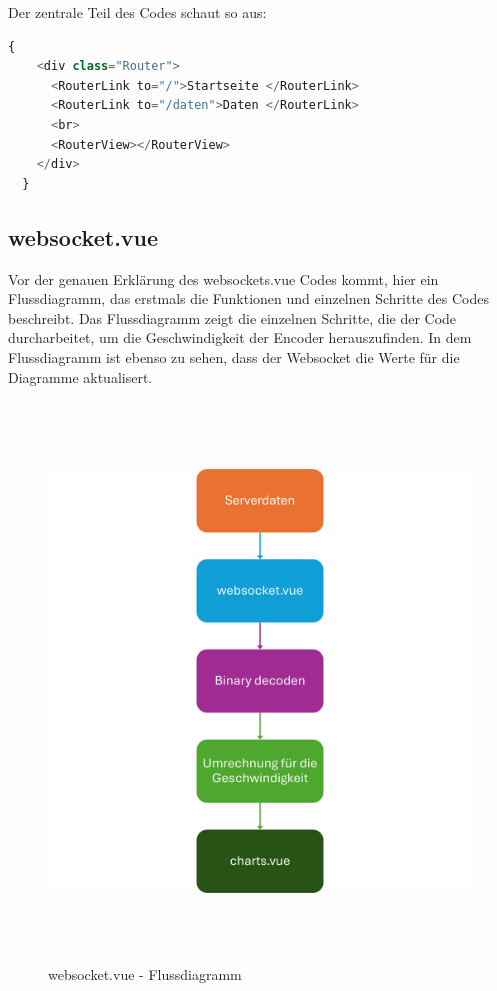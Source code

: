Der zentrale Teil des Codes schaut so aus:
\begin{lstlisting}[language=JavaScript, gobble=4]
  {
    <div class="Router">
      <RouterLink to="/">Startseite </RouterLink>
      <RouterLink to="/daten">Daten </RouterLink>
      <br>
      <RouterView></RouterView>
    </div>
  }
\end{lstlisting}

\subsection{websocket.vue}
\label{subsec:frontend_websocket.vue}

Vor der genauen Erklärung des websockets.vue Codes kommt,
hier ein Flussdiagramm, das erstmals die Funktionen und einzelnen Schritte
des Codes beschreibt.
%
Das Flussdiagramm zeigt die einzelnen Schritte, 
die der Code durcharbeitet, um die Geschwindigkeit der Encoder herauszufinden.
In dem Flussdiagramm ist ebenso zu sehen, 
dass der Websocket die Werte für die Diagramme aktualisert. 
%

\begin{figure}[H]
  \includegraphics[width=\textwidth, height=14.8cm, center]{img/Websocket_FD.png}
  \caption{websocket.vue - Flussdiagramm}
  \label{fig:websocket_Flowchart}
\end{figure}

